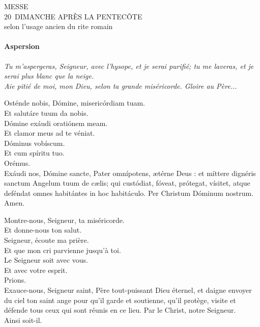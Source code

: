 \documentclass[twoside]{article}
\begin{document}

\sloppy

\begin{center}\begin{doublespace}
{
\MakeUppercase{\Large Messe\\20\ieme~dimanche après la Pentecôte}\\
selon l'usage ancien du rite romain
}
\end{doublespace}\end{center}

\paragraph{Aspersion}


\emph{\rr Tu m'aspergeras, Seigneur, avec l'hysope, et je serai purifié; tu me laveras, et je serai plus blanc que la neige.\\
\vv Aie pitié de moi, mon Dieu, selon ta grande miséricorde. Gloire au Père...}

\begin{paracol}{2}
\vv Osténde nobis, Dómine, misericórdiam tuam.\\
\rr Et salutáre tuum da nobis.\\
\vv Dómine exáudi oratiónem meam.\\
\rr Et clamor meus ad te véniat.\\
\vv Dóminus vobíscum.\\
\rr Et cum spíritu tuo.\\
\vv Orémus.\\
Exáudi nos, Dómine sancte, Pater omnípotens, ætérne Deus :
et míttere dignéris sanctum Angelum tuum de cælis; qui custódiat,
fóveat, prótegat, vísitet, atque deféndat omnes habitántes in hoc habitáculo.
Per Christum Dóminum nostrum.\\
\rr Amen.

\switchcolumn

\vv Montre-nous, Seigneur, ta miséricorde.\\
\rr Et donne-nous ton salut.\\
\vv Seigneur, écoute ma prière.\\
\rr Et que mon cri parvienne jusqu’à toi.\\
\vv Le Seigneur soit avec vous.\\
\rr Et avec votre esprit.\\
\vv Prions. \\
Exauce-nous, Seigneur saint, Père tout-puissant Dieu éternel,
et daigne envoyer du ciel ton saint ange pour qu’il garde et soutienne,
qu’il protège, visite et défende tous ceux qui sont réunis en ce lieu.
Par le Christ, notre Seigneur.\\
\rr Ainsi soit-il.

\end{paracol}
\end{document}
